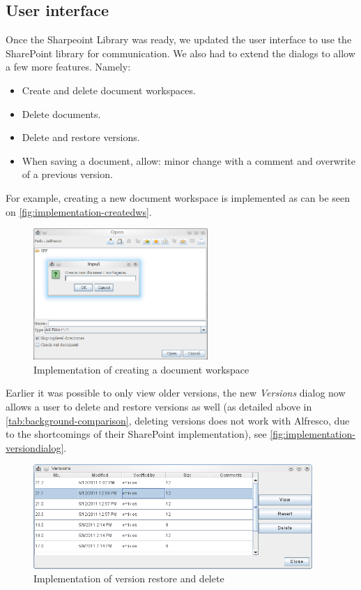 \subsection{User interface}

Once the Sharpeoint Library was ready, we updated the user interface to use the
SharePoint library for communication. We also had to extend the dialogs to allow
a few more features. Namely:

\begin{itemize}
\item Create and delete document workspaces.
\item Delete documents.
\item Delete and restore versions.
\item When saving a document, allow: minor change with a comment and overwrite of a previous version.
\end{itemize}

For example, creating a new document workspace is implemented as can be seen on
\autoref{fig:implementation-createdws}.

\begin{figure}[H]
\centering
\includegraphics[width=250px,keepaspectratio]{implementation-createdws.png}
\caption{Implementation of creating a document workspace}
\label{fig:implementation-createdws}
\end{figure}

Earlier it was possible to only view older versions, the new \emph{Versions}
dialog now allows a user to delete and restore versions as well (as detailed
above in \autoref{tab:background-comparison}, deleting versions does not work
with Alfresco, due to the shortcomings of their SharePoint implementation), see
\autoref{fig:implementation-versiondialog}.

\begin{figure}[H]
\centering
\includegraphics[width=400px,keepaspectratio]{implementation-versiondialog.png}
\caption{Implementation of version restore and delete}
\label{fig:implementation-versiondialog}
\end{figure}

